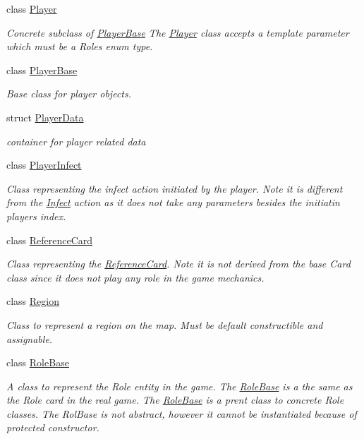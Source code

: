 \begin{DoxyCompactItemize}
class \hyperlink{classpan_1_1_player}{Player}
\begin{DoxyCompactList}\small\item\em Concrete subclass of \hyperlink{classpan_1_1_player_base}{Player\+Base} The \hyperlink{classpan_1_1_player}{Player} class accepts a template parameter which must be a Roles enum type. \end{DoxyCompactList}\item 
class \hyperlink{classpan_1_1_player_base}{Player\+Base}
\begin{DoxyCompactList}\small\item\em Base class for player objects. \end{DoxyCompactList}\item 
struct \hyperlink{structpan_1_1_player_data}{Player\+Data}
\begin{DoxyCompactList}\small\item\em container for player related data \end{DoxyCompactList}\item 
class \hyperlink{classpan_1_1_player_infect}{Player\+Infect}
\begin{DoxyCompactList}\small\item\em Class representing the infect action initiated by the player. Note it is different from the \hyperlink{classpan_1_1_infect}{Infect} action as it does not take any parameters besides the initiatin player\textquotesingle{}s index. \end{DoxyCompactList}\item 
class \hyperlink{classpan_1_1_reference_card}{Reference\+Card}
\begin{DoxyCompactList}\small\item\em Class representing the \hyperlink{classpan_1_1_reference_card}{Reference\+Card}. Note it is not derived from the base Card class since it does not play any role in the game mechanics. \end{DoxyCompactList}\item 
class \hyperlink{classpan_1_1_region}{Region}
\begin{DoxyCompactList}\small\item\em Class to represent a region on the map. Must be default constructible and assignable. \end{DoxyCompactList}\item 
class \hyperlink{classpan_1_1_role_base}{Role\+Base}
\begin{DoxyCompactList}\small\item\em A class to represent the Role entity in the game. The \hyperlink{classpan_1_1_role_base}{Role\+Base} is a the same as the Role card in the real game. The \hyperlink{classpan_1_1_role_base}{Role\+Base} is a prent class to concrete Role classes. The Rol\+Base is not abstract, however it cannot be instantiated because of protected constructor. \end{DoxyCompactList}\item 

\end{DoxyCompactItemize}
